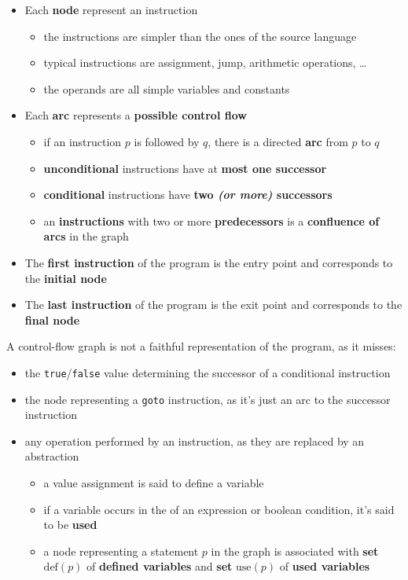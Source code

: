 \documentclass[english]{article}
\begin{document}
\begin{itemize}
  \item Each \textbf{node} represent an instruction
        \begin{itemize}
          \item the instructions are simpler than the ones of the source language
          \item typical instructions are assignment, jump, arithmetic operations, \ldots
          \item the operands are all simple variables and constants
        \end{itemize}
  \item Each \textbf{arc} represents a \textbf{possible control flow}
        \begin{itemize}
          \item if an instruction \(p\) is followed by \(q\), there is a directed \textbf{arc} from \(p\) to \(q\)
          \item \textbf{unconditional} instructions have at \textbf{most one successor}
          \item \textbf{conditional} instructions have \textbf{two \textit{(or more)} successors}
          \item an \textbf{instructions} with two or more \textbf{predecessors} is a \textbf{confluence of arcs} in the graph
        \end{itemize}
  \item The \textbf{first instruction} of the program is the entry point and corresponds to the \textbf{initial node}
  \item The \textbf{last instruction} of the program is the exit point and corresponds to the \textbf{final node}
\end{itemize}

A control-flow graph is not a faithful representation of the program, as it misses:

\begin{itemize}
  \item the \texttt{true}/\texttt{false} value determining the successor of a conditional instruction
  \item the node representing a \texttt{goto} instruction, as it's just an arc to the successor instruction
  \item any operation performed by an instruction, as they are replaced by an abstraction
        \begin{itemize}
          \item a value assignment is said to define a variable
          \item if a variable occurs in the \RP of an expression or boolean condition, it's said to be \textbf{used}
          \item a node representing a statement \(p\) in the graph is associated with \textbf{set} \(\text{def}(p)\) of \textbf{defined variables} and \textbf{set} \(\text{use}(p)\) of \textbf{used variables}
        \end{itemize}
\end{itemize}
\end{document}
